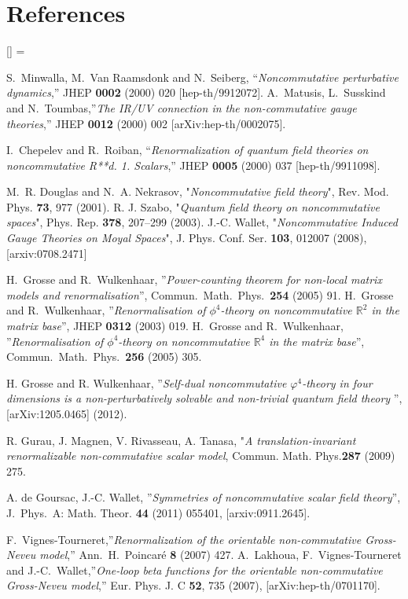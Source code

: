 \documentclass[a4paper,11pt,twoside]{article}
\numberwithin{equation}{section}
\theoremstyle{nonumberplain}
\newcounter{and}
\renewenvironment{thebibliography}[1]{%
\section*{References}%
\frenchspacing\small%
\begin{list}{[\arabic{enumi}]}%
{%
\usecounter{enumi}\parsep=2pt\topsep 0pt%
\settowidth{\labelwidth}{[#1]}%
\leftmargin=\labelwidth\advance\leftmargin\labelsep%
\rightmargin=0pt\itemsep=1pt\sloppy%
}%
}{\end{list}}
\begin{document}
\begin{thebibliography}{88}
  S.~Minwalla, M.~Van Raamsdonk and N.~Seiberg,
  ``{\it{Noncommutative perturbative dynamics}},''
  JHEP {\bf 0002} (2000) 020
  [hep-th/9912072]. A.~Matusis, L.~Susskind and N.~Toumbas,''{\it{The IR/UV connection in the non-commutative gauge theories}},'' JHEP {\bf 0012} (2000) 002 [arXiv:hep-th/0002075].
	
  I.~Chepelev and R.~Roiban,
  ``{\it{Renormalization of quantum field theories on noncommutative R**d. 1. Scalars}},''
  JHEP {\bf 0005} (2000) 037
  [hep-th/9911098].

%
M.~R. Douglas and N.~A. Nekrasov, "{\it{Noncommutative field theory}}", {Rev. Mod. Phys. \textbf{73}, 977 (2001)}. R. J. Szabo, "{\it{Quantum field theory on noncommutative spaces}}", {Phys. Rep. \textbf{378}, 207--299 (2003)}. 
J.-C. Wallet, "{\it{Noncommutative Induced Gauge Theories on Moyal Spaces}}", {J. Phys. Conf. Ser. \textbf{103}, 012007 (2008)}, %
[arxiv:0708.2471]



H.~Grosse and R.~Wulkenhaar, ''{\it{Power-counting theorem for non-local matrix models and renormalisation}}'', Commun.\ Math.\ Phys.\  {\bf 254} (2005) 91. H.~Grosse and R.~Wulkenhaar, ''{\it{Renormalisation of $\phi^4$-theory on noncommutative $\mathbb{R}^2$ in the matrix base}}'', JHEP {\bf 0312} (2003) 019. 
H.~Grosse and R.~Wulkenhaar, ''{\it{Renormalisation of $\phi^4$-theory on noncommutative $\mathbb{R}^4$ in the matrix base}}'', 
Commun.\ Math.\ Phys.\  {\bf 256} (2005) 305.

H. Grosse and R. Wulkenhaar, ''{\it{Self-dual noncommutative $\varphi^4$-theory in four dimensions is a non-perturbatively solvable and non-trivial quantum field theory}} '', [arXiv:1205.0465] (2012).

  R. Gurau, J. Magnen, V. Rivasseau, A. Tanasa, "{\it{A translation-invariant renormalizable non-commutative scalar model}}, Commun. Math. Phys.{\bf{287}} (2009) 275.

 A. de Goursac, J.-C. Wallet, ''{\it{Symmetries of noncommutative scalar field theory}}'', J.\ Phys.\ A: Math. Theor. {\bf{44}} (2011) 055401, [arxiv:0911.2645]. 



 F.~Vignes-Tourneret,''{\it{Renormalization of the orientable non-commutative Gross-Neveu model}},''  Ann.\ H.\ Poincar\'e {\bf{8}} (2007) 427. 
A.~Lakhoua, F.~Vignes-Tourneret and J.-C.~Wallet,''{\it{One-loop beta functions for the orientable non-commutative Gross-Neveu
 model}},'' Eur. Phys. J. C {\bf{52}}, 735 (2007), [arXiv:hep-th/0701170]. 


\end{thebibliography}
\end{document}
